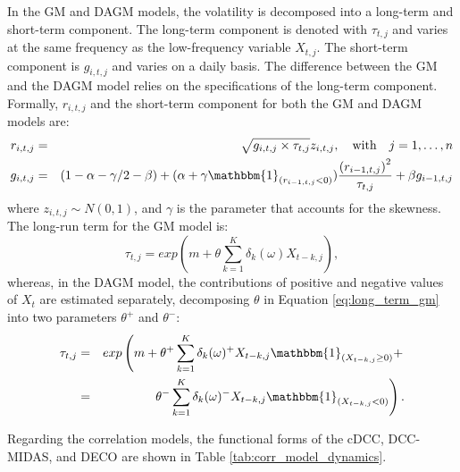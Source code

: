 In the GM and DAGM models, the volatility is decomposed into a long-term and short-term component. The long-term component is denoted with $\tau_{t,j}$ and varies at the same frequency as the low-frequency variable $X_{t,j}$. The short-term component is $g_{i,t,j}$ and varies on a daily basis. The difference between the GM and the DAGM model relies on the specifications of the long-term component. 
Formally,  $r_{i,t,j}$ and the short-term component for both the GM and DAGM models are:
\begin{eqnarray}
	r_{i,t,j}&=&\sqrt{g_{i,t,j} \times \tau_{t,j}} z_{i,t,j}, \quad \text{with} \quad j=1,\dots,n\\
	g_{i,t,j} &=& \left(1-\alpha-\gamma/2-\beta\right) + (\alpha + \gamma \mathbbm{1}_{\left( r_{i-1,t,j} < 0 \right)}) \frac{\left(r_{i-1,t,j}\right)^2}{\tau_{t,j}} + \beta g_{i-1,t,j} \label{eq:short_term_dagm}
\end{eqnarray}
where $z_{i,t,j} \sim N(0,1)$, and $\gamma$ is the parameter that accounts for the skewness. The long-run term for the GM model is:
\begin{equation}
\tau_{t,j} = exp \left( m + 
\theta \sum_{k=1}^K \delta_k(\omega)  X_{t-k,j}  \right),
\label{eq:long_term_gm}
\end{equation}
whereas, in the DAGM model, the contributions of positive and negative values of $X_t$ are estimated separately,  decomposing $\theta$ in Equation \eqref{eq:long_term_gm} into two parameters $\theta^{+}$ and $\theta^{-}$:
\begin{eqnarray}
\tau_{t,j} &=& exp \left( m + 
\theta^{+}  \sum_{k=1}^K \delta_k(\omega)^{+}  X_{t-k,j} \mathbbm{1}_{\left( X_{t-k,j} \geq 0 \right)} + \right. \nonumber \\
&=& \left. \theta^{-}  \sum_{k=1}^K \delta_k(\omega)^{-} X_{t-k,j} \mathbbm{1}_{\left( X_{t-k,j} < 0 \right)} \right).
\label{eq:long_term_dagm}
\end{eqnarray}

Regarding the correlation models, the functional forms of the cDCC, DCC-MIDAS, and DECO  are shown in Table \ref{tab:corr_model_dynamics}.

